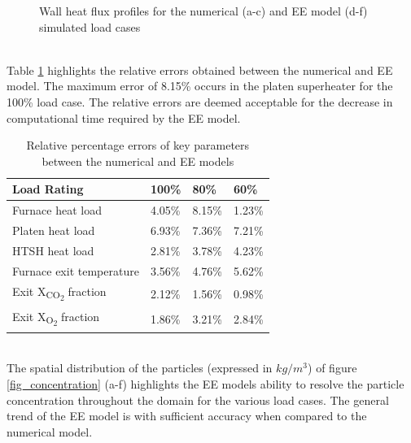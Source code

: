\documentclass{webofc}
\begin{document}
\begin{figure}[h!]
\setlength{\belowcaptionskip}{0pt} 
\caption{Wall heat flux profiles for the numerical (a-c) and EE model (d-f) simulated load cases}
\label{fig_wall_heat}
\end{figure}\\
Table \ref{tab_rel_err} highlights the relative errors obtained between the numerical and EE model. The maximum error of 8.15\% occurs in the platen superheater for the 100\% load case. The relative errors are deemed acceptable for the decrease in computational time required by the EE model.
\begin{table}[h!]
\centering
\caption{Relative percentage errors of key parameters between the numerical and EE models}\label{tab_rel_err}       
\begin{tabular}{llll}
\hline
Load Rating & 100\% & 80\% & 60\%   \\
\hline
Furnace heat load & 4.05\% & 8.15\% & 1.23\%   \\
Platen heat load & 6.93\% & 7.36\% & 7.21\%   \\
HTSH heat load & 2.81\% & 3.78\% & 4.23\%  \\
Furnace exit temperature & 3.56\% & 4.76\% & 5.62\%  \\
Exit X\textsubscript{CO\textsubscript{2}} fraction & 2.12\% & 1.56\% & 0.98\% \\
Exit X\textsubscript{O\textsubscript{2}} fraction & 1.86\% &3.21\% & 2.84\%\\
\hline
\end{tabular}
\end{table}\\
The spatial distribution of the particles (expressed in $kg/m^3$) of figure \ref{fig_concentration} (a-f) highlights the EE models ability to resolve the particle concentration throughout the domain for the various load cases. The general trend of the EE model is with sufficient accuracy when compared to the numerical model.\\
\end{document}

